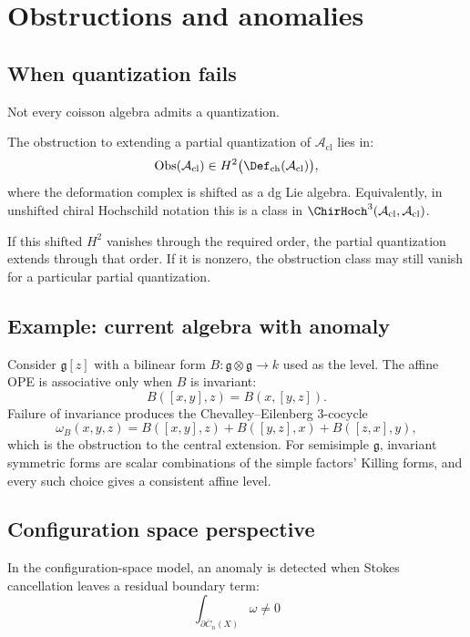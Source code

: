 \section{Obstructions and anomalies}

\subsection{When quantization fails}

Not every coisson algebra admits a quantization.

\begin{theorem}
\label{thm:obstruction-quantization}
The obstruction to extending a partial quantization of
$\mathcal{A}_{\text{cl}}$ lies in:
\[
\operatorname{Obs}(\mathcal{A}_{\text{cl}})
\in H^2\bigl(\Def_{\mathrm{ch}}(\mathcal{A}_{\text{cl}})\bigr),
\]
where the deformation complex is shifted as a dg Lie algebra.
Equivalently, in unshifted chiral Hochschild notation this is a
class in $\ChirHoch^3(\mathcal A_{\mathrm{cl}},\mathcal A_{\mathrm{cl}})$.

If this shifted $H^2$ vanishes through the required order, the partial
quantization extends through that order. If it is nonzero, the
obstruction class may still vanish for a particular partial
quantization.
\end{theorem}

\subsection{Example: current algebra with anomaly}

Consider $\mathfrak{g}[z]$ with a bilinear form
$B\colon\mathfrak g\otimes\mathfrak g\to k$ used as the level. The
affine OPE is associative only when $B$ is invariant:
\[
B([x,y],z)=B(x,[y,z]).
\]
Failure of invariance produces the Chevalley--Eilenberg $3$-cocycle
\[
\omega_B(x,y,z)=B([x,y],z)+B([y,z],x)+B([z,x],y),
\]
which is the obstruction to the central extension. For semisimple
$\mathfrak g$, invariant symmetric forms are scalar combinations of
the simple factors' Killing forms, and every such choice gives a
consistent affine level.

\subsection{Configuration space perspective}

In the configuration-space model, an anomaly is detected when Stokes
cancellation leaves a residual boundary term:
\[\int_{\partial \overline{C}_n(X)} \omega \neq 0\]

